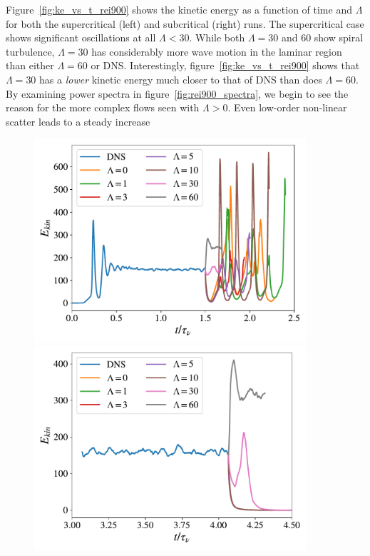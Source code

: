 \documentclass[openacc]{rstransa}%
\begin{document}
Figure~\ref{fig:ke_vs_t_rei900} shows the kinetic energy as a function of time and $\Lambda$ for both the supercritical (left) and subcritical (right) runs. 
The supercritical case shows significant oscillations at all $\Lambda < 30$.
While both $\Lambda = 30$ and 60 show spiral turbulence, $\Lambda=30$ has considerably more wave motion in the laminar region than either $\Lambda = 60$ or DNS. 
Interestingly, figure~\ref{fig:ke_vs_t_rei900} shows that $\Lambda=30$ has a \emph{lower} kinetic energy much closer to that of DNS than does $\Lambda=60$.
By examining power spectra in figure~\ref{fig:rei900_spectra}, we begin to see the reason for the more complex flows seen with $\Lambda > 0$. Even low-order non-linear scatter leads to a steady increase 
\begin{figure}
    \centering
    \begin{minipage}{0.45\textwidth}
        \centering
        \includegraphics[width=0.9\textwidth]{figs/rei900_reo_-3398_KE_vs_t.pdf}
    \end{minipage}
    \begin{minipage}{0.45\textwidth}
        \centering
        \includegraphics[width=0.9\textwidth]{figs/rei700_reo_-3398_KE_vs_t.pdf}

\end{minipage}
\end{figure}
\end{document}
